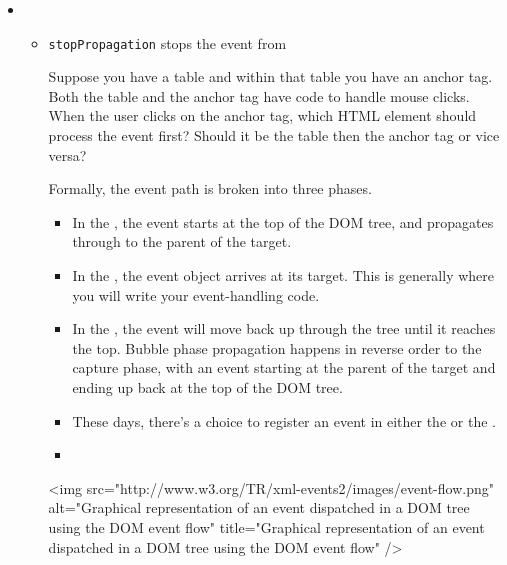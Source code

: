 \begin{itemize}
\begin{itemize}
\item
  \begin{itemize}
    \item \verb|stopPropagation| stops the event from 

      Suppose you have a table and within that table you have an anchor
      tag. Both the table and the anchor tag have code to handle mouse
      clicks. When the user clicks on the anchor tag, which HTML element should
      process the event first? Should it be the table then the anchor tag or
      vice versa?

      Formally, the event path is broken into three phases. 
      \begin{itemize}
      \item
      In the , the event starts at the top of the DOM tree, and propagates through
      to the parent of the target. 
      \item
      In the , the event object arrives
      at its target. This is generally where you will write your event-handling
      code. 
      \item
      In the , the event will move back up through the tree
      until it reaches the top. Bubble phase propagation happens in reverse
      order to the capture phase, with an event starting at the parent of
      the target and ending up back at the top of the DOM tree. 
      \item
      These days,
      there’s a choice to register an event in either the 
      or the . 


      \item {}
      \end{itemize}
      \begin{rawhtml}
      <img src="http://www.w3.org/TR/xml-events2/images/event-flow.png" 
      alt="Graphical representation of an event dispatched in a DOM tree using the DOM event flow" title="Graphical representation of an event dispatched in a DOM tree using the DOM event flow" />
      \end{rawhtml}



\end{itemize}
\end{itemize}
\end{itemize}
